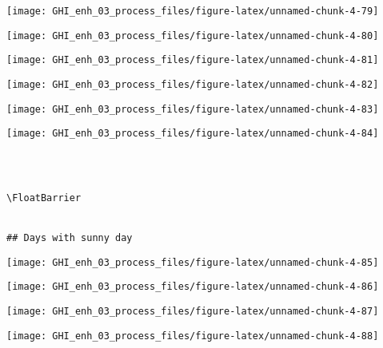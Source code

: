 \documentclass[
  10pt,
  a4paper,oneside]{article}
\begin{document}
\begin{center}\texttt{[image: GHI\_enh\_03\_process\_files/figure-latex/unnamed-chunk-4-79]} \end{center}

\begin{center}\texttt{[image: GHI\_enh\_03\_process\_files/figure-latex/unnamed-chunk-4-80]} \end{center}

\begin{center}\texttt{[image: GHI\_enh\_03\_process\_files/figure-latex/unnamed-chunk-4-81]} \end{center}

\begin{center}\texttt{[image: GHI\_enh\_03\_process\_files/figure-latex/unnamed-chunk-4-82]} \end{center}

\begin{center}\texttt{[image: GHI\_enh\_03\_process\_files/figure-latex/unnamed-chunk-4-83]} \end{center}

\begin{center}\texttt{[image: GHI\_enh\_03\_process\_files/figure-latex/unnamed-chunk-4-84]} \end{center}

\begin{verbatim}
 
 

\FloatBarrier


## Days with sunny day 
\end{verbatim}

\begin{center}\texttt{[image: GHI\_enh\_03\_process\_files/figure-latex/unnamed-chunk-4-85]} \end{center}

\begin{center}\texttt{[image: GHI\_enh\_03\_process\_files/figure-latex/unnamed-chunk-4-86]} \end{center}

\begin{center}\texttt{[image: GHI\_enh\_03\_process\_files/figure-latex/unnamed-chunk-4-87]} \end{center}

\begin{center}\texttt{[image: GHI\_enh\_03\_process\_files/figure-latex/unnamed-chunk-4-88]} \end{center}
\end{document}
